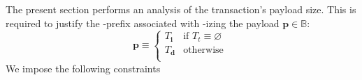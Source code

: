 \begin{center}
\end{center}
The present section performs an analysis of the transaction's payload size.
This is required to justify the \rlp{}-prefix associated with \rlp{}-izing the payload
$\textbf{p} \in \mathbb{B}$:
\[
	\textbf{p} \equiv
	\begin{cases}
		T_\textbf{i} & \text{if } T_t \equiv \varnothing \\
		T_\textbf{d} & \text{otherwise }                 \\
	\end{cases}
\]
We impose the following constraints
